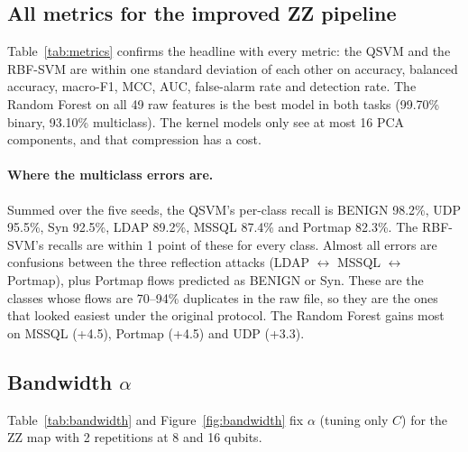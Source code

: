 \subsection{All metrics for the improved ZZ pipeline}

\begin{table}[H]
\centering\small
\caption{All metrics (\%), improved protocol, ZZ with the paper's circuit settings, 5 seeds.
FAR: benign flows flagged as attacks. DR: attack flows flagged as some attack.}
\label{tab:metrics}
\end{table}

Table~\ref{tab:metrics} confirms the headline with every metric: the QSVM and the RBF-SVM are
within one standard deviation of each other on accuracy, balanced accuracy, macro-F1, MCC, AUC,
false-alarm rate and detection rate. The Random Forest on all 49 raw features is the best model
in both tasks (99.70\% binary, 93.10\% multiclass). The kernel models only see at most 16 PCA
components, and that compression has a cost.

\paragraph{Where the multiclass errors are.} Summed over the five seeds, the QSVM's per-class
recall is BENIGN 98.2\%, UDP 95.5\%, Syn 92.5\%, LDAP 89.2\%, MSSQL 87.4\% and Portmap 82.3\%.
The RBF-SVM's recalls are within 1 point of these for every class. Almost all errors are
confusions between the three reflection attacks (LDAP $\leftrightarrow$ MSSQL $\leftrightarrow$
Portmap), plus Portmap flows predicted as BENIGN or Syn. These are the classes whose flows are
70--94\% duplicates in the raw file, so they are the ones that looked easiest under the original
protocol. The Random Forest gains most on MSSQL (+4.5), Portmap (+4.5) and UDP (+3.3).

\subsection{Bandwidth $\alpha$}

Table~\ref{tab:bandwidth} and Figure~\ref{fig:bandwidth} fix $\alpha$ (tuning only $C$) for the
ZZ map with 2 repetitions at 8 and 16 qubits.

